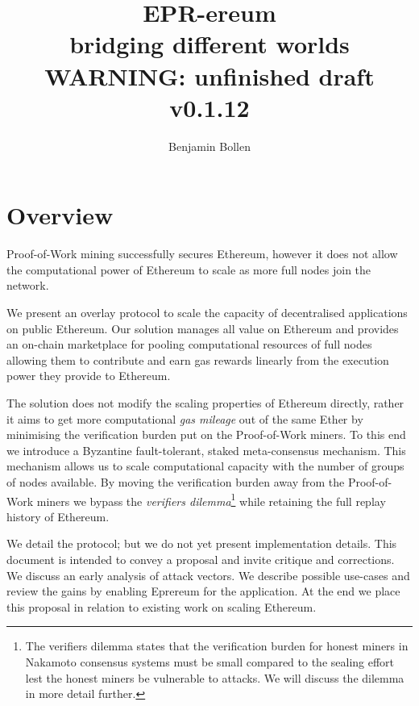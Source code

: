 \documentclass[twocolumn]{article}
\begin{document}
\title{EPR-ereum \\ bridging different worlds \\ \textbf{WARNING: unfinished draft v0.1.12}}
\author{Benjamin Bollen}
\maketitle
\section*{Overview}
Proof-of-Work mining successfully secures Ethereum, however it does not allow the computational power of Ethereum to scale as more full nodes join the network.

We present an overlay protocol to scale the capacity of decentralised applications on public Ethereum. Our solution manages all value on Ethereum and provides an on-chain marketplace for pooling computational resources of full nodes allowing them to contribute and earn gas rewards linearly from the execution power they provide to Ethereum.

The solution does not modify the scaling properties of Ethereum directly, rather it aims to get more computational \emph{gas mileage} out of the same Ether by minimising the verification burden put on the Proof-of-Work miners.  To this end we introduce a Byzantine fault-tolerant, staked meta-consensus mechanism. This mechanism allows us to scale computational capacity with the number of groups of nodes available.  By moving the verification burden away from the Proof-of-Work miners we bypass the \emph{verifiers dilemma}\footnote{The verifiers dilemma states that the verification burden for honest miners in Nakamoto consensus systems must be small compared to the sealing effort lest the honest miners be vulnerable to attacks. We will discuss the dilemma in more detail further.} while retaining the full replay history of Ethereum.

We detail the protocol; but we do not yet present implementation details.  This document is intended to convey a proposal and invite critique and corrections.  We discuss an early analysis of attack vectors. We describe possible use-cases and review the gains by enabling Eprereum for the application. At the end we place this proposal in relation to existing work on scaling Ethereum.
\end{document}
